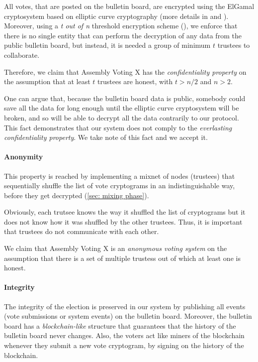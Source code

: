 All votes, that are posted on the bulletin board, are encrypted using the ElGamal cryptosystem based on elliptic curve cryptography (more details in  and ). Moreover, using a \textit{t out of n} threshold encryption scheme (), we enforce that there is no single entity that can perform the decryption of any data from the public bulletin board, but instead, it is needed a group of minimum $t$ trustees to collaborate.

Therefore, we claim that Assembly Voting X has the \textit{confidentiality property} on the assumption that at least $t$ trustees are honest, with \( t > n / 2 \) and \( n > 2 \).

One can argue that, because the bulletin board data is public, somebody could save all the data for long enough until the elliptic curve cryptosystem will be broken, and so will be able to decrypt all the data contrarily to our protocol. This fact demonstrates that our system does not comply to the \textit{everlasting confidentiality property}. We take note of this fact and we accept it.

\paragraph{Anonymity}
This property is reached by implementing a mixnet of nodes (trustees) that sequentially shuffle the list of vote cryptograms in an indistinguishable way, before they get decrypted (\cref{sec: mixing phase}).

Obviously, each trutsee knows the way it shuffled the list of cryptograms but it does not know how it was shuffled by the other trustees. Thus, it is important that trustees do not communicate with each other.

We claim that Assembly Voting X is an \textit{anonymous voting system} on the assumption that there is a set of multiple trustess out of which at least one is honest.

\paragraph{Integrity}
The integrity of the election is preserved in our system by publishing all events (vote submissions or system events) on the bulletin board. Moreover, the bulletin board has a \textit{blockchain-like} structure that guarantees that the history of the bulletin board never changes. Also, the voters act like miners of the blockchain whenever they submit a new vote cryptogram, by signing on the history of the blockchain.

